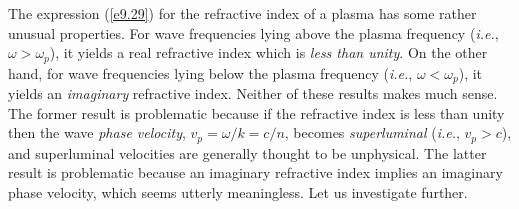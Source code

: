 The expression (\ref{e9.29}) for the refractive index of a plasma has some rather
unusual properties. For wave frequencies lying above the plasma frequency ({\em i.e.}, $\omega>\omega_p$),  it yields a real refractive index which is
{\em less than unity}. On the other hand, for wave frequencies lying below the plasma
frequency ({\em i.e.}, $\omega<\omega_p$),  it yields an {\em imaginary}\/ refractive index. Neither of these results  makes much sense. The former result is problematic because if the
refractive index is less than unity then the wave {\em phase velocity}, $v_p=\omega/k = c/n$, becomes
{\em superluminal}\/ ({\em i.e.}, $v_p>c$),  and superluminal velocities are generally thought to be unphysical. 
The latter result is problematic because an imaginary refractive index implies an
imaginary phase velocity, which seems utterly meaningless. Let us investigate further.

